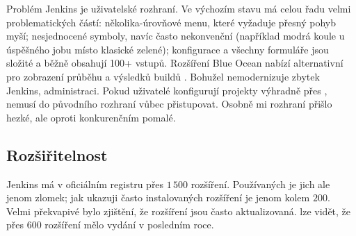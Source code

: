         Problém Jenkins je uživatelské rozhraní. Ve výchozím stavu má  celou řadu velmi problematických částí: několika-úrovňové menu, které vyžaduje přesný pohyb myší; nesjednocené symboly, navíc často nekonvenční (například modrá koule u úspěšného jobu místo klasické zelené); konfigurace a všechny formuláře jsou složité a běžně obsahují 100+ vstupů. Rozšíření Blue Ocean nabízí alternativní  pro zobrazení průběhu a výsledků buildů \cite{jenkins-plugin-blueocean}. Bohužel nemodernizuje zbytek Jenkins, administraci. Pokud uživatelé konfigurují projekty výhradně přes , nemusí do původního rozhraní vůbec přistupovat. Osobně mi rozhraní přišlo hezké, ale oproti konkurenčním \CICD pomalé.

    \subsection{Rozšiřitelnost}
        Jenkins má v oficiálním registru přes $1\,500$ rozšíření. Používaných je jich ale jenom zlomek; jak ukazuji  často instalovaných rozšíření je jenom kolem $200$. Velmi překvapivé bylo zjištění, že rozšíření jsou často aktualizovaná.  lze vidět, že přes $600$ rozšíření mělo vydání v posledním roce.

